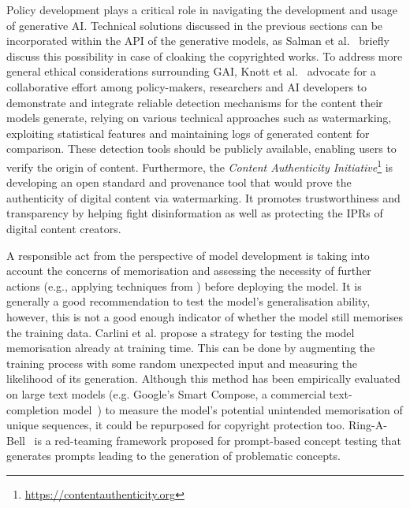 \documentclass[conference,table]{IEEEtran} %
\begin{document}
Policy development plays a critical role in navigating the development and usage of generative AI. 
Technical solutions discussed in the previous sections can be incorporated within the API of the generative models, as Salman et al.~\cite{salman_raising_2023} briefly discuss this possibility in case of cloaking the copyrighted works. 
To address more general ethical considerations surrounding GAI, Knott et al.~\cite{knott_generative_2023} advocate for a collaborative effort among policy-makers, researchers and AI developers to demonstrate and integrate reliable detection mechanisms for the content their models generate, relying on various technical approaches such as watermarking, exploiting statistical features and maintaining logs of generated content for comparison. These detection tools should be publicly available, enabling users to verify the origin of content. 
Furthermore, the \textit{Content Authenticity Initiative}\footnote{\url{https://contentauthenticity.org}} is developing an open standard and provenance tool that would prove the authenticity of digital content via watermarking. 
It promotes trustworthiness and transparency by helping fight disinformation as well as protecting the IPRs of digital content creators.%

A responsible act from the perspective of model development is taking into account the concerns of memorisation and assessing the necessity of further actions (e.g., applying techniques from ) before deploying the model.
It is generally a good recommendation to test the model's generalisation ability, however, this is not a good enough indicator of whether the model still memorises the training data. 
Carlini et al. \cite{carlini_secret_2019} propose a strategy for testing the model memorisation already at training time. 
This can be done by augmenting the training process with some random unexpected input and measuring the likelihood of its generation. 
Although this method has been empirically evaluated on large text models (e.g. Google's Smart Compose, a commercial text-completion model~\cite{chen_gmail_2019}) to measure the model's potential unintended memorisation of unique sequences, it could be repurposed for copyright protection too. 
Ring-A-Bell~\cite{tsai_ring--bell_2023} is a red-teaming framework proposed for prompt-based concept testing that generates prompts leading to the generation of problematic concepts.
\end{document}
